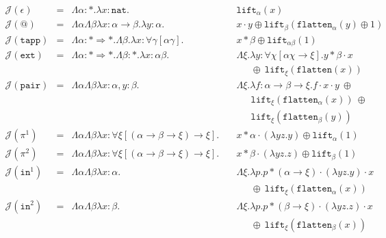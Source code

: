 \documentclass[runningheads,a4paper]{llncs}
\newcommand{\Termmap}{\mathcal{J}}
\newcommand{\quant}[2]{\forall #1[#2]}
\newcommand{\arrtype}{\rightarrow}
\newcommand{\arrkind}{\Rightarrow}
\newcommand{\abs}[2]{\lambda #1.#2}
\newcommand{\tabs}[2]{\Lambda #1.#2}
\newcommand{\nat}{\mathtt{nat}}
\newcommand{\flatten}{\mathtt{flatten}}
\newcommand{\lift}{\mathtt{lift}}
\begin{document}
\[
\begin{array}{rcll}
\Termmap(\epsilon) & = & \Lambda \alpha:* . \lambda x:\nat. &
  \mathtt{lift}_\alpha(x) \\
\Termmap(@) & = & \Lambda\alpha\Lambda\beta\lambda x: \alpha \arrtype \beta . \lambda y :
  \alpha . \quad & x \cdot y \oplus \lift_\beta(\flatten_\alpha(
  y) \oplus 1) \\
\Termmap(\mathtt{tapp}) & = & \Lambda \alpha : * \arrkind * . \Lambda \beta . \lambda x : \quant{\gamma}{\alpha\gamma} . \quad & x * \beta \oplus \lift_{\alpha\beta}(1) \\
\Termmap(\mathtt{ext}) & = & \Lambda \alpha : * \arrkind * . \Lambda \beta : * . \lambda x:\alpha\beta . &
  \tabs{\xi}{\abs{y:\quant{\chi}{\alpha\chi
  \arrtype \xi}}{y * \beta \cdot x}} \\
  & & & \phantom{AB}\oplus\ \lift_\xi(\flatten(x)) \\
\Termmap(\mathtt{pair}) & = & \Lambda \alpha \Lambda \beta \lambda x :
  \alpha, y : \beta.\quad & \Lambda \xi.\abs{f:\alpha \arrtype \beta
  \arrtype \xi}{f \cdot x \cdot y\ \oplus \\
  & & & \phantom{AB}\lift_{\xi}(\flatten_\alpha(x))\ \oplus \\
  & & & \phantom{AB}\lift_\xi(\flatten_\beta(y))} \\
\Termmap(\pi^1) & = & \Lambda \alpha \Lambda \beta \lambda x :
  \quant{\xi}{(\alpha \arrtype \beta \arrtype \xi) \arrtype \xi}.\quad
  & x * \alpha \cdot (\abs{yz}{y}) \oplus \lift_{\alpha}(1) \\
\Termmap(\pi^2) & = & \Lambda \alpha \Lambda \beta \lambda x :
  \quant{\xi}{(\alpha \arrtype \beta \arrtype \xi) \arrtype \xi}.\quad
  & x * \beta \cdot (\abs{yz}{z}) \oplus \lift_{\beta}(1) \\
\Termmap(\mathtt{in}^1) & = & \Lambda \alpha \Lambda \beta \lambda x : \alpha.\quad &
  \Lambda \xi.\lambda p.p * (\alpha \arrtype \xi) \cdot (\abs{yz}{y})
  \cdot x \\
  & & & \phantom{AB}\oplus\ \lift_\xi(\flatten_\alpha(x)) \\
\Termmap(\mathtt{in}^2) & = & \Lambda \alpha \Lambda \beta \lambda x : \beta.\quad &
  \Lambda \xi.\lambda p.p * (\beta \arrtype \xi) \cdot (\abs{yz}{z})
  \cdot x \\
  & & & \phantom{AB}\oplus\ \lift_\xi(\flatten_\beta(x)) \\
\end{array}
\]
\end{document}
